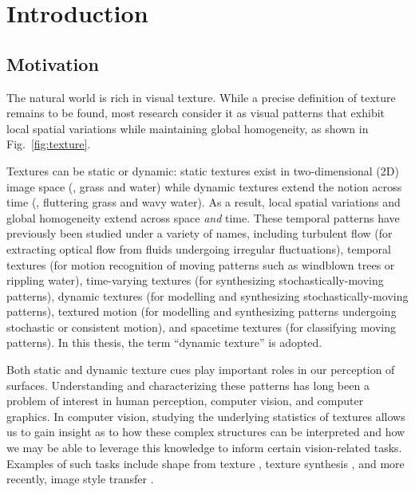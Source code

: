 \chapter{Introduction }

\section{Motivation}

The natural world is rich in visual texture. While a precise definition of 
texture remains to be found, most research consider it as visual patterns that 
exhibit local spatial variations while maintaining global homogeneity, as shown in Fig.\ \ref{fig:texture}.



Textures 
can be static or dynamic: static textures exist in two-dimensional (2D) image space 
(\eg, grass and water) while dynamic textures extend the notion across time (\eg, 
fluttering grass and wavy water). As a result, local spatial variations and 
global homogeneity extend across space \emph{and} time. These temporal patterns 
have previously been studied under a variety of names, including turbulent flow \cite{heeger1986} (for extracting optical flow from fluids undergoing irregular fluctuations), temporal textures \cite{nelson1992} (for motion recognition of moving patterns such as windblown trees or rippling water), time-varying 
textures \cite{bar-joseph2001} (for synthesizing stochastically-moving patterns), dynamic textures \cite{doretto2003} (for modelling and synthesizing stochastically-moving patterns), textured 
motion \cite{wang2003} (for modelling and synthesizing patterns undergoing stochastic or consistent motion), and spacetime textures \cite{derpanis2012spacetime} (for classifying moving patterns).
In this thesis, the term ``dynamic texture'' is adopted.

Both static and dynamic texture cues play important roles in our perception of 
surfaces. Understanding and characterizing these patterns has long been a problem 
of interest in human perception, computer vision, and computer graphics. In 
computer vision, studying the underlying statistics of textures allows us to gain 
insight as to how these complex structures can be interpreted and how we may be 
able to leverage this knowledge to inform certain vision-related tasks. Examples 
of such tasks include shape from texture \cite{gibson1950perception}, texture 
synthesis \cite{heeger1995pyramid}, and more recently, image style transfer 
\cite{gatys2016image}.

